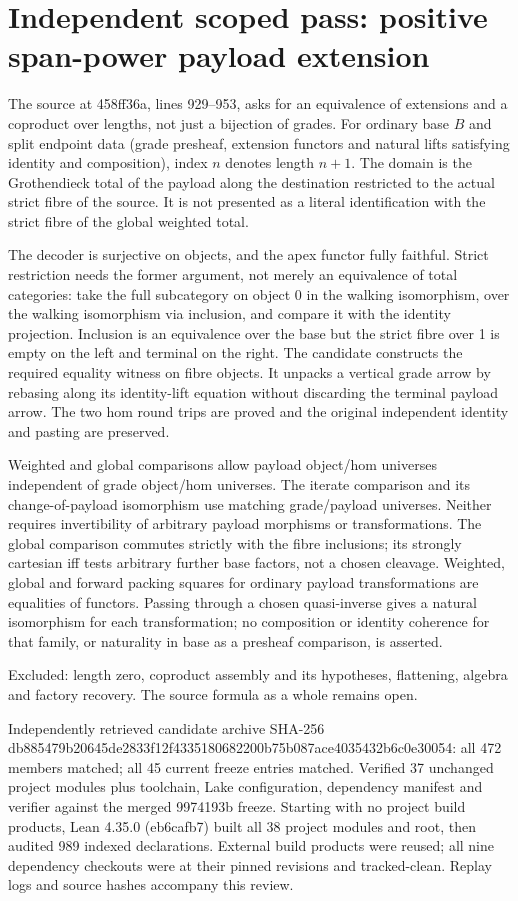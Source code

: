 \documentclass{article}
\begin{document}
\section*{Independent scoped pass: positive span-power payload extension}
The source at 458ff36a, lines 929--953, asks for an equivalence of extensions and a coproduct over lengths, not just a bijection of grades. For ordinary base $B$ and split endpoint data (grade presheaf, extension functors and natural lifts satisfying identity and composition), index $n$ denotes length $n+1$. The domain is the Grothendieck total of the payload along the destination restricted to the actual strict fibre of the source. It is not presented as a literal identification with the strict fibre of the global weighted total.
\par The decoder is surjective on objects, and the apex functor fully faithful. Strict restriction needs the former argument, not merely an equivalence of total categories: take the full subcategory on object 0 in the walking isomorphism, over the walking isomorphism via inclusion, and compare it with the identity projection. Inclusion is an equivalence over the base but the strict fibre over 1 is empty on the left and terminal on the right. The candidate constructs the required equality witness on fibre objects. It unpacks a vertical grade arrow by rebasing along its identity-lift equation without discarding the terminal payload arrow. The two hom round trips are proved and the original independent identity and pasting are preserved.
\par Weighted and global comparisons allow payload object/hom universes independent of grade object/hom universes. The iterate comparison and its change-of-payload isomorphism use matching grade/payload universes. Neither requires invertibility of arbitrary payload morphisms or transformations. The global comparison commutes strictly with the fibre inclusions; its strongly cartesian iff tests arbitrary further base factors, not a chosen cleavage. Weighted, global and forward packing squares for ordinary payload transformations are equalities of functors. Passing through a chosen quasi-inverse gives a natural isomorphism for each transformation; no composition or identity coherence for that family, or naturality in base as a presheaf comparison, is asserted.
\par Excluded: length zero, coproduct assembly and its hypotheses, flattening, algebra and factory recovery. The source formula as a whole remains open.
\par Independently retrieved candidate archive SHA-256 db885479b20645de2833f12f4335180682200b75b087ace4035432b6c0e30054: all 472 members matched; all 45 current freeze entries matched. Verified 37 unchanged project modules plus toolchain, Lake configuration, dependency manifest and verifier against the merged 9974193b freeze. Starting with no project build products, Lean 4.35.0 (eb6cafb7) built all 38 project modules and root, then audited 989 indexed declarations. External build products were reused; all nine dependency checkouts were at their pinned revisions and tracked-clean. Replay logs and source hashes accompany this review.
\end{document}
